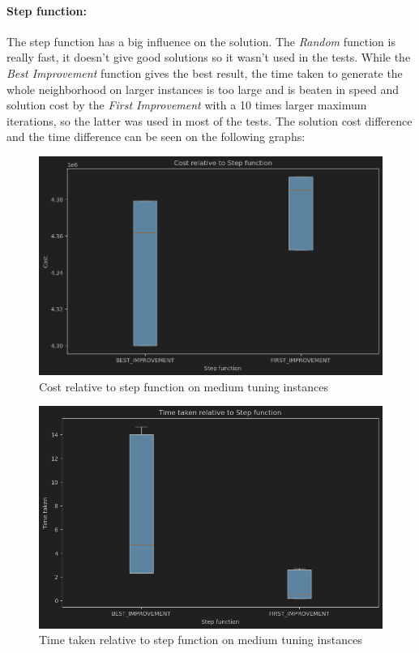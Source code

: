 \documentclass{article}
\begin{document}
\paragraph{Step function:}
The step function has a big influence on the solution. The \textit{Random} function is really fast, it doesn't give good solutions so it wasn't used in the tests. While the \textit{Best Improvement} function gives the best result, the time taken to generate the whole neighborhood on larger instances is too large and is beaten in speed and solution cost by the \textit{First Improvement} with a 10 times larger maximum iterations, so the latter was used in most of the tests. The solution cost difference and the time difference can be seen on the following graphs:

\begin{figure}[H]
	\includegraphics[width=\linewidth]{cost_step_vnd_med.png}
	\caption{Cost relative to step function on medium tuning instances}
\end{figure}

\begin{figure}[H]
	\includegraphics[width=\linewidth]{time_step_vnd_med.png}
	\caption{Time taken relative to step function on medium tuning instances}
\end{figure}
\end{document}

